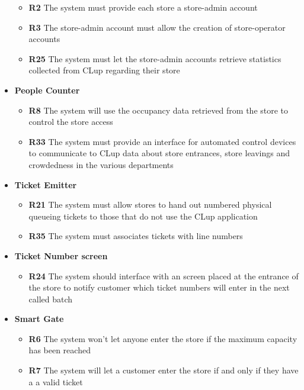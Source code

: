 \begin{itemize}
          \begin{itemize}
              \item \textbf{R2} The system must provide each store a store-admin account
              \item \textbf{R3} The store-admin account must allow the creation of store-operator accounts
              \item \textbf{R25} The system must let the store-admin accounts retrieve statistics collected from CLup regarding their store
          \end{itemize}
    \item \colorbox{clup_yellow}{\textbf{People Counter}}
          \begin{itemize}
              \item \textbf{R8} The system will use the occupancy data retrieved from the store to control the store access
              \item \textbf{R33} The system must provide an interface for automated control devices to communicate to CLup data about store entrances, store leavings and crowdedness in the various departments
          \end{itemize}
    \item \colorbox{clup_yellow}{\textbf{Ticket Emitter}}
          \begin{itemize}
              \item \textbf{R21} The system must allow stores to hand out numbered physical queueing tickets to those that do not use the CLup application
              \item \textbf{R35} The system must associates tickets with line numbers
          \end{itemize}
    \item \colorbox{clup_yellow}{\textbf{Ticket Number screen}}
          \begin{itemize}
              \item \textbf{R24} The system should interface with an screen placed at the entrance of the store to notify customer which ticket numbers will enter in the next called batch
          \end{itemize}
    \item \colorbox{clup_yellow}{\textbf{Smart Gate}}
          \begin{itemize}
              \item \textbf{R6} The system won’t let anyone enter the store if the maximum capacity has been reached
              \item \textbf{R7} The system will let a customer enter the store if and only if they have a a valid ticket

\end{itemize}
\end{itemize}
